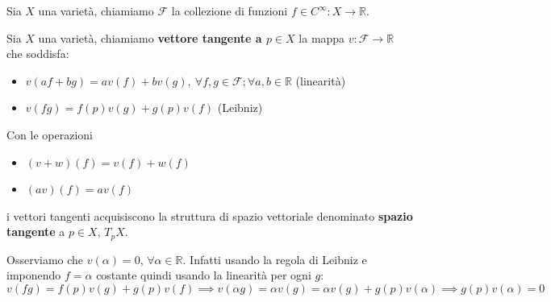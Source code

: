 \begin{definizione}
Sia $X$ una varietà, chiamiamo $\mathcal{F}$ la collezione di funzioni $ f \in C^\infty : X \rightarrow \mathbb{R} $.
\end{definizione}

\begin{definizione}
Sia $X$ una varietà, chiamiamo \textbf{vettore tangente a $p \in X$} la mappa $v : \mathcal{F} \rightarrow \mathbb{R}$ che soddisfa:
\begin{itemize}
    \item $v(af +bg) = av(f) + bv(g), \ \forall f,g \in \mathcal{F}; \forall a,b \in \mathbb{R}$ (linearità)
    \item $v(fg)= f(p)v(g) + g(p)v(f)$ (Leibniz)
\end{itemize}
Con le operazioni
\begin{itemize}
    \item $(v+w)(f) = v(f) + w(f)$
    \item $(av)(f) = av(f)$
\end{itemize}
i vettori tangenti acquisiscono la struttura di spazio vettoriale denominato \textbf{spazio tangente} a $p\in X$, $T_pX$.
\end{definizione}
Osserviamo che $v(\alpha) = 0$, $\forall \alpha \in \mathbb{R}$. Infatti usando la regola di Leibniz e imponendo $f=\alpha$ costante quindi usando la linearità per ogni $g$:
\begin{equation*}
    v(fg)=f(p)v(g) + g(p)v(f) \implies v(\alpha g) = \alpha v(g) = \alpha v(g) + g(p)v(\alpha) \implies g(p)v(\alpha)=0
\end{equation*}

